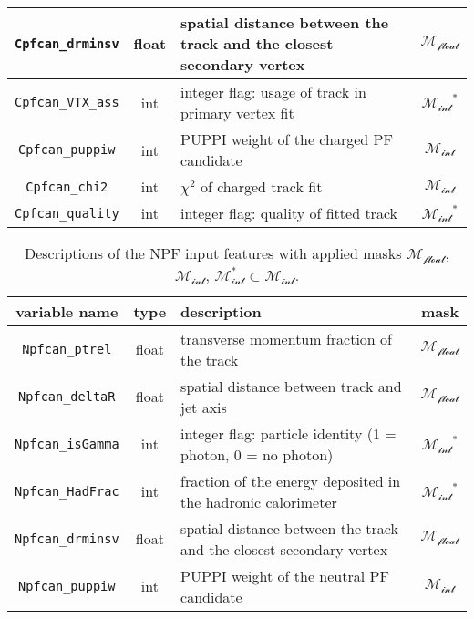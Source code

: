 \begin{table}[ht]
\begin{tabularx}{\textwidth}{|c|c|X|c|}
\hline
\texttt{Cpfcan\_drminsv} & float & spatial distance between the track and the closest secondary vertex & \cellcolor{green!50}$\mathcal{M_{\text{float}}}$ \\
\hline
\texttt{Cpfcan\_VTX\_ass} & int & integer flag: usage of track in primary vertex fit & \cellcolor{orange!50}$\mathcal{M_{\text{int}}}^*$ \\
\hline
\texttt{Cpfcan\_puppiw} & int & PUPPI weight of the charged PF candidate & \cellcolor{red!50}$\mathcal{M_{\text{int}}}$ \\
\hline
\texttt{Cpfcan\_chi2} & int & \( \chi^2 \) of charged track fit & \cellcolor{red!50}$\mathcal{M_{\text{int}}}$ \\
\hline
\texttt{Cpfcan\_quality} & int & integer flag: quality of fitted track & \cellcolor{orange!50}$\mathcal{M_{\text{int}}}^*$ \\
\hline
\end{tabularx}
\label{tab:cpf_input_features}
\end{table}


\begin{table}[ht]
\centering
\caption{Descriptions of the NPF input features with applied masks $\mathcal{M_{\text{float}}}$, $\mathcal{M_{\text{int}}}$, $\mathcal{M_{\text{int}}^*\subset M_{\text{int}}}$.}
\begin{tabularx}{\textwidth}{|c|c|X|c|}
\hline
\textbf{variable name} & \textbf{type} & \textbf{description} & \textbf{mask} \\
\hline
\texttt{Npfcan\_ptrel} & float & transverse momentum fraction of the track & \cellcolor{green!50}$\mathcal{M_{\text{float}}}$ \\
\hline
\texttt{Npfcan\_deltaR} & float & spatial distance between track and jet axis & \cellcolor{green!50}$\mathcal{M_{\text{float}}}$ \\
\hline
\texttt{Npfcan\_isGamma} & int & integer flag: particle identity (1 = photon, 0 = no photon) & \cellcolor{orange!50}$\mathcal{M_{\text{int}}}^*$ \\
\hline
\texttt{Npfcan\_HadFrac} & int & fraction of the energy deposited in the hadronic calorimeter & \cellcolor{orange!50}$\mathcal{M_{\text{int}}}^*$ \\
\hline
\texttt{Npfcan\_drminsv} & float & spatial distance between the track and the closest secondary vertex & \cellcolor{green!50}$\mathcal{M_{\text{float}}}$ \\
\hline
\texttt{Npfcan\_puppiw} & int & PUPPI weight of the neutral PF candidate & \cellcolor{red!50}$\mathcal{M_{\text{int}}}$ \\
\hline
\end{tabularx}
\label{tab:npf_input_features}
\end{table}


